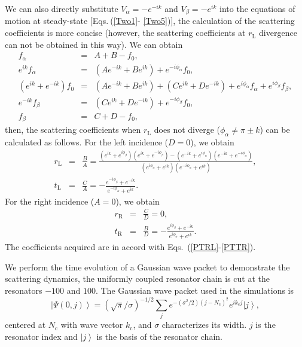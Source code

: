 \documentclass[prl,showpacs,superscriptaddress,twocolumn]{revtex4-1}
\begin{document}
\begin{widetext}
We can also directly substitute $V_{\alpha }=-e^{-ik}$ and $V_{\beta
}=-e^{ik}$ into the equations of motion at steady-state [Eqs.$~$(\ref{Two1}-%
\ref{Two5})], the calculation of the scattering coefficients is more concise
(however, the scattering coefficients at $r_{\mathrm{L}}$ divergence can not
be obtained in this way). We can obtain
\begin{eqnarray}
f_{\alpha } &=&A+B-f_{0}, \\
e^{ik}f_{\alpha } &=&\left( Ae^{-ik}+Be^{ik}\right) +e^{-i\phi _{\alpha
}}f_{0}, \\
\left( e^{ik}+e^{-ik}\right) f_{0} &=&\left( Ae^{-ik}+Be^{ik}\right) +\left(
Ce^{ik}+De^{-ik}\right) +e^{i\phi _{\alpha }}f_{\alpha }+e^{i\phi _{\beta
}}f_{\beta }, \\
e^{-ik}f_{\beta } &=&\left( Ce^{ik}+De^{-ik}\right) +e^{-i\phi _{\beta
}}f_{0}, \\
f_{\beta } &=&C+D-f_{0},
\end{eqnarray}%
then, the scattering coefficients when $r_{\mathrm{L}}$ does not diverge ($%
\phi _{\alpha }\neq \pi \pm k$) can be calculated as follows. For the left
incidence ($D=0$), we obtain%
\begin{eqnarray}
r_{\mathrm{L}} &=&\frac{B}{A}=\frac{\left( e^{ik}+e^{i\phi _{\beta }}\right)
\left( e^{ik}+e^{-i\phi _{\beta }}\right) -\left( e^{-ik}+e^{i\phi _{\alpha
}}\right) \left( e^{-ik}+e^{-i\phi _{\alpha }}\right) }{\left( e^{i\phi
_{\alpha }}+e^{ik}\right) \left( e^{-i\phi _{\alpha }}+e^{ik}\right) }, \\
t_{\mathrm{L}} &=&\frac{C}{A}=-\frac{e^{-i\phi _{\beta }}+e^{-ik}}{e^{-i\phi
_{\alpha }}+e^{ik}}.
\end{eqnarray}%
For the right incidence ($A=0$), we obtain
\begin{eqnarray}
r_{\mathrm{R}} &=&\frac{C}{D}=0, \\
t_{\mathrm{R}} &=&\frac{B}{D}=-\frac{e^{i\phi _{\beta }}+e^{-ik}}{e^{i\phi
_{\alpha }}+e^{ik}}.
\end{eqnarray}%
The coefficients acquired are in accord with Eqs.~(\ref{PTRL}-\ref{PTTR}).

We perform the time evolution of a Gaussian wave packet to demonstrate the
scattering dynamics, the uniformly coupled resonator chain is cut at the
resonators $-100$ and $100$. The Gaussian wave packet used in the
simulations is
\begin{equation}
\left\vert \Psi \left( 0,j\right) \right\rangle =(\sqrt{\pi }/\sigma
)^{-1/2}\sum_{j}e^{-(\sigma ^{2}/2)\left( j-N_{\mathrm{c}}\right)
^{2}}e^{ik_{\mathrm{c}}j}\left\vert j\right\rangle ,
\end{equation}%
centered at $N_{\mathrm{c}}$ with wave vector $k_{\mathrm{c}}$, and $\sigma $
characterizes its width. $j$ is the resonator index and $\left\vert
j\right\rangle $ is the basis of the resonator chain.


\end{widetext}
\end{document}
